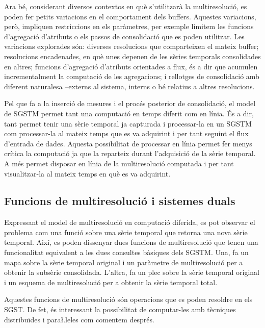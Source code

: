 Ara bé, considerant diversos contextos en què s'utilitzarà la
multiresolució, es poden fer petits variacions en el comportament dels
buffers. Aquestes variacions, però, impliquen restriccions en els
paràmetres, per exemple limitem les funcions d'agregació d'atributs o
els passos de consolidació que es poden utilitzar.  Les variacions
explorades són: diverses resolucions que comparteixen el mateix
buffer; resolucions encadenades, en què unes depenen de les sèries
temporals consolidades en altres; funcions d'agregació d'atributs
orientades a flux, és a dir que acumulen incrementalment la computació
de les agregacions; i rellotges de consolidació amb diferent
naturalesa --externs al sistema, interns o bé relatius a altres
resolucions.




Pel que fa a la inserció de mesures i el procés posterior de
consolidació, el model de \gls{SGSTM} permet tant una computació en
temps diferit com en línia. És a dir, tant permet tenir una sèrie
temporal ja capturada i processar-la en un \gls{SGSTM} com
processar-la al mateix temps que es va adquirint i per tant seguint el
flux d'entrada de dades.  Aquesta possibilitat de processar en línia
permet fer menys crítica la computació ja que la reparteix durant
l'adquisició de la sèrie temporal. A més permet disposar en línia de
la multiresolució computada i per tant visualitzar-la al mateix temps
en què es va adquirint.






\subsection{Funcions de multiresolució i sistemes duals}


Expressant el model de multiresolució en computació diferida, es pot
observar el problema com una funció sobre una sèrie temporal que
retorna una nova sèrie temporal. Així, es poden dissenyar dues
funcions de multiresolució que tenen una funcionalitat equivalent a
les dues consultes bàsiques dels \gls{SGSTM}. Una, fa un mapa sobre la
sèrie temporal original i un paràmetre de multiresolució per a obtenir
la subsèrie consolidada. L'altra, fa un plec sobre la sèrie temporal
original i un esquema de multiresolució per a obtenir la sèrie
temporal total.

Aquestes funcions de multiresolució són operacions que es poden
resoldre en els \gls{SGST}. De fet, és interessant la possibilitat de
computar-les amb tècniques distribuïdes i para\l.leles com comentem
després.




